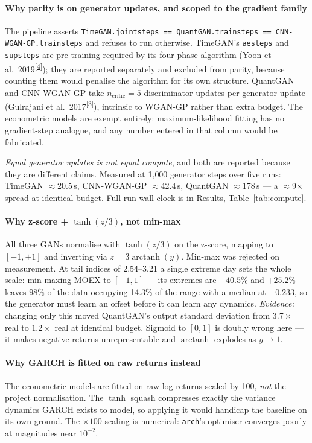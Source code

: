 \documentclass[11pt,a4paper]{article}
\makeatletter
\newcommand{\tcite}[1]{\textsuperscript{[\hyperlink{R:#1}{#1}]}}
\DeclareRobustCommand{\_}{\ifmmode\nfss@text{\textunderscore}\else\textunderscore\allowbreak\fi}
\makeatother
\begin{document}
\paragraph{Why parity is on generator updates, and scoped to the gradient family} The pipeline asserts \texttt{TimeGAN.joint\_steps == QuantGAN.train\_steps == CNN-WGAN-GP.train\_steps} and refuses to run otherwise. TimeGAN's \texttt{ae\_steps} and \texttt{sup\_steps} are pre-training required by its four-phase algorithm (Yoon et al.\ 2019\tcite{4}); they are reported separately and excluded from parity, because counting them would penalise the algorithm for its own structure. QuantGAN and CNN-WGAN-GP take $n_\text{critic}=5$ discriminator updates per generator update (Gulrajani et al.\ 2017\tcite{3}), intrinsic to WGAN-GP rather than extra budget. The econometric models are exempt entirely: maximum-likelihood fitting has no gradient-step analogue, and any number entered in that column would be fabricated.

\textit{Equal generator updates is not equal compute}, and both are reported because they are different claims. Measured at 1{,}000 generator steps over five runs: TimeGAN $\approx$20.5\,s, CNN-WGAN-GP $\approx$42.4\,s, QuantGAN $\approx$178\,s --- a $\approx$9$\times$ spread at identical budget. Full-run wall-clock is in Results, Table~\ref{tab:compute}.

\paragraph{Why z-score + $\tanh(z/3)$, not min-max} All three GANs normalise with $\tanh(z/3)$ on the z-score, mapping to $[-1,+1]$ and inverting via $z = 3\operatorname{arctanh}(y)$. Min-max was rejected on measurement. At tail indices of 2.54--3.21 a single extreme day sets the whole scale: min-maxing MOEX to $[-1,1]$ --- its extremes are \(-40.5\%\) and \(+25.2\%\) --- leaves $98\%$ of the data occupying 14.3\% of the range with a median at \(+0.233\), so the generator must learn an offset before it can learn any dynamics. \textit{Evidence:} changing only this moved QuantGAN's output standard deviation from $3.7\times$ real to $1.2\times$ real at identical budget. Sigmoid to $[0,1]$ is doubly wrong here --- it makes negative returns unrepresentable and $\operatorname{arctanh}$ explodes as $y\to1$.

\paragraph{Why GARCH is fitted on raw returns instead} The econometric models are fitted on raw log returns scaled by 100, \emph{not} the project normalisation. The $\tanh$ squash compresses exactly the variance dynamics GARCH exists to model, so applying it would handicap the baseline on its own ground. The $\times100$ scaling is numerical: \texttt{arch}'s optimiser converges poorly at magnitudes near $10^{-2}$.
\end{document}
